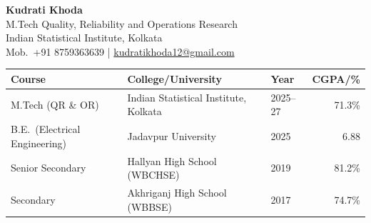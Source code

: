 \documentclass[10pt,a4paper]{article}
\begin{document}
{\LARGE\textbf{Kudrati Khoda}}\\[0.2em]
M.Tech Quality, Reliability and Operations Research\\
Indian Statistical Institute, Kolkata\\
Mob.\ +91 8759363639 \;|\; \href{mailto:kudratikhoda12@gmail.com}{kudratikhoda12@gmail.com}

\vspace{0.5em}
{\small
\begin{tabularx}{\linewidth}{@{}Xllr@{}}
\hline
\textbf{Course} & \textbf{College/University} & \textbf{Year} & \textbf{CGPA/\%}\\
\hline
M.Tech (QR \& OR) & Indian Statistical Institute, Kolkata & 2025--27 & 71.3\%\\
B.E.\ (Electrical Engineering) & Jadavpur University & 2025 & 6.88\\
Senior Secondary & Hallyan High School (WBCHSE) & 2019 & 81.2\%\\
Secondary & Akhriganj High School (WBBSE) & 2017 & 74.7\%\\
\hline
\end{tabularx}}
\end{document}
